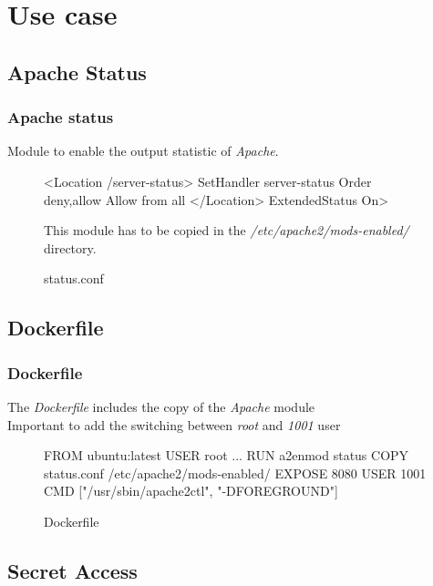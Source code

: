 
\section{Use case}

\subsection{Apache Status}

\begin{frame}[fragile]
  \frametitle{Apache status}
  Module to enable the output statistic of \emph{Apache}.

  \begin{figure}
    \begin{apachecode}
      <Location /server-status>
        SetHandler server-status
        Order deny,allow
        Allow from all
      </Location> ExtendedStatus On>
    \end{apachecode}
    \caption{status.conf}

    This module has to be copied in the \emph{/etc/apache2/mods-enabled/} directory.
  \end{figure}
\end{frame}

\subsection{Dockerfile}

\begin{frame}[fragile]
  \frametitle{Dockerfile}
  The \emph{Dockerfile} includes the copy of the \emph{Apache} module\\
  Important to add the switching between \textit{root} and \textit{1001} user
  \begin{figure}
    \begin{dockercode}
      FROM ubuntu:latest
      USER root
      ...
      RUN a2enmod status
      COPY status.conf /etc/apache2/mods-enabled/
      EXPOSE 8080
      USER 1001
      CMD ["/usr/sbin/apache2ctl", "-DFOREGROUND"]
    \end{dockercode}
    \caption{Dockerfile}
  \end{figure}
\end{frame}

\subsection{Secret Access}

